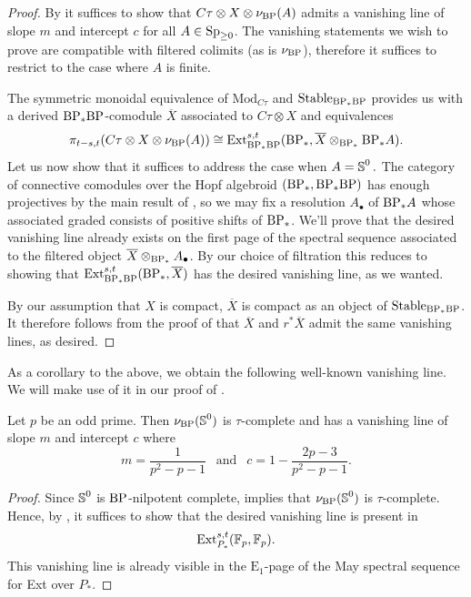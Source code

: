 \begin{proof}
    By  it suffices to show that $C\tau \otimes X \otimes \nu_{\mathrm{BP}} (A)$ admits a vanishing line of slope $m$ and intercept $c$ for all $A \in \operatorname{\mathrm{Sp}}_{\geq 0}$. The vanishing statements we wish to prove are compatible with filtered colimits (as is $\nu_{\mathrm{BP}}$), therefore it suffices to restrict to the case where $A$ is finite.

  The symmetric monoidal equivalence of $\mathrm{Mod}_{C\tau}$ and $\mathrm{Stable}_{\mathrm{BP}_*\mathrm{BP}}$ provides us with a derived $\mathrm{BP}_*\mathrm{BP}$-comodule $\overline{X}$ associated to $C\tau \otimes X$ and equivalences 
    $$ \pi_{t-s,t}(C\tau \otimes X \otimes \nu_{\mathrm{BP}} (A)) \cong \operatorname{\mathrm{Ext}}_{\mathrm{BP}_*\mathrm{BP}} ^{s,t} (\mathrm{BP}_*, \overline{X} \otimes_{\mathrm{BP}_*} \mathrm{BP}_*A). $$
    Let us now show that it suffices to address the case when $A = \operatorname{\mathbb{S}}^0.$ The category of connective comodules over the Hopf algebroid $(\mathrm{BP}_*, \mathrm{BP}_*\mathrm{BP})$ has enough projectives by the main result of \cite{SalchEnoughProj}, so we may fix a resolution $A_\bullet$ of $\mathrm{BP}_* A$ whose associated graded consists of positive shifts of $\mathrm{BP}_*$.
    We'll prove that the desired vanishing line already exists on the first page of the spectral sequence associated to the filtered object $\overline{X} \otimes_{\mathrm{BP}_*} A_\bullet$. By our choice of filtration this reduces to showing that $\operatorname{\mathrm{Ext}}_{\mathrm{BP}_*\mathrm{BP}}^{s,t}(\mathrm{BP}_*, \overline{X})$ has the desired vanishing line, as we wanted.
  
    By our assumption that $X$ is compact, $\overline{X}$ is compact as an object of $\mathrm{Stable}_{\mathrm{BP}_* \mathrm{BP}}$. It therefore follows from the proof of \cite[Proposition 4.22]{AchimThesis} that $\overline{X}$ and $r^*\overline{X}$ admit the same vanishing lines, as desired.
\end{proof}

As a corollary to the above, we obtain the following well-known vanishing line. We will make use of it in our proof of .

\begin{prop}\label{prop:easy-ANSS-vl}
    Let $p$ be an odd prime. Then
  \label{prop:AN-vl}
  $\nu_{\mathrm{BP}}(\operatorname{\mathbb{S}}^0)$ is $\tau$-complete and has a vanishing line of slope $m$ and intercept $c$ where
  $$ m = \frac{1}{p^2 - p -1}\ \ \text{   and   }\ \ c = 1 - \frac{2p-3}{p^2 - p -1}. $$
\end{prop}

\begin{proof}
    Since $\operatorname{\mathbb{S}}^0$ is $\mathrm{BP}$-nilpotent complete,  implies that $\nu_{\mathrm{BP}}(\operatorname{\mathbb{S}}^0)$ is $\tau$-complete. Hence, by , it suffices to show that the desired vanishing line is present in
  $$ \operatorname{\mathrm{Ext}}_{P_*}^{s,t}(\operatorname{\mathbb{F}}_p, \operatorname{\mathbb{F}}_p). $$
    This vanishing line is already visible in the $\mathrm{E}_1$-page of the May spectral sequence for Ext over $P_*$.
\end{proof}

